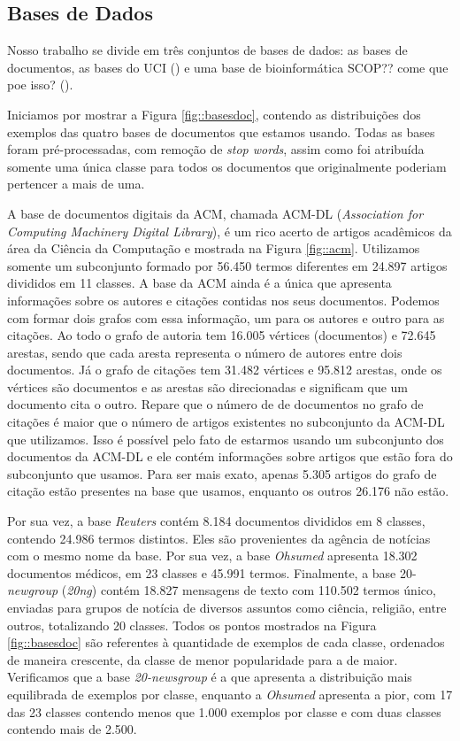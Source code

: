 \subsection{Bases de Dados}
\label{subsec::base}

Nosso trabalho se divide em três conjuntos de bases de dados: as bases de documentos, as bases do \textsc{UCI} (\cite{UCI98}) e uma base de bioinformática SCOP?? come que poe isso? (\cite{SCOP95}).

Iniciamos por mostrar a Figura \ref{fig::basesdoc}, contendo as distribuições dos exemplos das quatro bases de documentos que estamos usando. Todas as bases foram pré-processadas, com remoção de \textit{stop words}, assim como foi atribuída somente uma única classe para todos os documentos que originalmente poderiam pertencer a mais de uma.

A base de documentos digitais da \textsc{ACM}, chamada \textsc{ACM-DL} (\textit{Association for Computing Machinery Digital Library}), é um rico acerto de artigos acadêmicos da área da Ciência da Computação e mostrada na Figura \ref{fig::acm}. Utilizamos somente um subconjunto formado por 56.450 termos diferentes em 24.897 artigos divididos em 11 classes. 
A base da \textsc{ACM} ainda é a única que apresenta informações sobre os autores e citações contidas nos seus documentos. 
Podemos com formar dois grafos com essa informação, um para os autores e outro para as citações.
Ao todo o grafo de autoria tem 16.005 vértices (documentos) e 72.645 arestas, sendo que cada aresta representa o número de autores entre dois documentos.
Já o grafo de citações tem 31.482 vértices e 95.812 arestas, onde os vértices são documentos e as arestas são direcionadas e significam que um documento cita o outro. 
Repare que o número de de documentos no grafo de citações é maior que o número de artigos existentes no subconjunto da \textsc{ACM-DL} que utilizamos. Isso é possível pelo fato de estarmos usando um subconjunto dos documentos da \textsc{ACM-DL} e ele contém informações sobre artigos que estão fora do subconjunto que usamos. Para ser mais exato, apenas 5.305 artigos do grafo de citação estão presentes na base que usamos, enquanto os outros 26.176 não estão.

Por sua vez, a base \textit{Reuters} contém 8.184 documentos divididos em 8 classes, contendo 24.986 termos distintos. Eles são provenientes da agência de notícias com o mesmo nome da base. 
Por sua vez, a base \textit{Ohsumed} apresenta 18.302 documentos médicos, em 23 classes e 45.991 termos.
Finalmente, a base 20-\textit{newgroup} (\textit{20ng}) contém 18.827 mensagens de texto com 110.502 termos único, enviadas para grupos de notícia de diversos assuntos como ciência, religião, entre outros, totalizando 20 classes.
Todos os pontos mostrados na Figura \ref{fig::basesdoc} são referentes à quantidade de exemplos de cada classe, ordenados de maneira crescente, da classe de menor popularidade para a de maior. Verificamos que a base \textit{20-newsgroup} é a que apresenta a distribuição mais equilibrada de exemplos por classe, enquanto a \textit{Ohsumed} apresenta a pior, com 17 das 23 classes contendo menos que 1.000 exemplos por classe e com duas classes contendo mais de 2.500.

